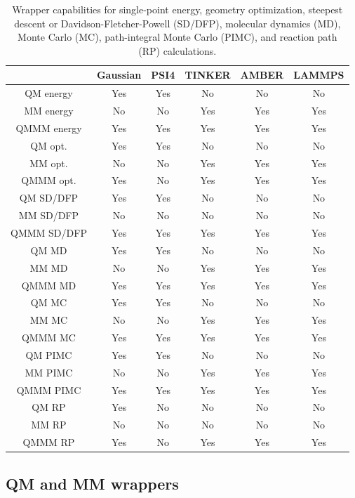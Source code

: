 \documentclass[12pt]{report}
\begin{document}
\begin{table}[hbt]
 \centering
 \begin{tabular}{|c|c c|c c c|}
 \hline
  & Gaussian & PSI4 & TINKER & AMBER & LAMMPS \\ \hline
 QM energy & Yes & Yes & No & No & No \\
 MM energy & No & No & Yes & Yes & Yes \\
 QMMM energy & Yes & Yes & Yes & Yes & Yes \\ \hline
 QM opt. & Yes & Yes & No & No & No \\
 MM opt. & No & No & Yes & Yes & Yes \\
 QMMM opt. & Yes & No & Yes & Yes & Yes \\ \hline
 QM SD/DFP & Yes & Yes & No & No & No \\
 MM SD/DFP & No & No & No & No & No \\
 QMMM SD/DFP & Yes & Yes & Yes & Yes & Yes \\ \hline
 QM MD & Yes & Yes & No & No & No \\
 MM MD & No & No & Yes & Yes & Yes \\
 QMMM MD & Yes & Yes & Yes & Yes & Yes \\ \hline
 QM MC & Yes & Yes & No & No & No \\ 
 MM MC & No & No & Yes & Yes & Yes \\
 QMMM MC & Yes & Yes & Yes & Yes & Yes \\ \hline
 QM PIMC & Yes & Yes & No & No & No \\
 MM PIMC & No & No & Yes & Yes & Yes \\
 QMMM PIMC & Yes & Yes & Yes & Yes & Yes \\ \hline
 QM RP & Yes & No & No & No & No \\
 MM RP & No & No & No & No & No \\
 QMMM RP & Yes & No & Yes & Yes & Yes \\ \hline
 \end{tabular}
 \caption{Wrapper capabilities for single-point energy, geometry optimization,
 steepest descent or Davidson-Fletcher-Powell (SD/DFP), molecular dynamics
 (MD), Monte Carlo (MC), path-integral Monte Carlo (PIMC), and reaction path
 (RP) calculations.}
 \label{tab:WrapCap}
\end{table}

\subsection{QM and MM wrappers}
\end{document}
